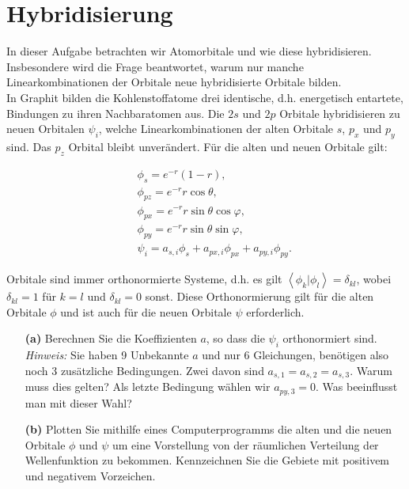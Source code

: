 \section{Hybridisierung}


In dieser Aufgabe betrachten wir Atomorbitale und wie diese hybridisieren. Insbesondere wird die Frage beantwortet, warum nur manche Linearkombinationen der Orbitale neue hybridisierte Orbitale bilden. \\

In Graphit bilden die Kohlenstoffatome drei identische, d.h. energetisch entartete, Bindungen zu ihren Nachbaratomen aus. Die $2s$ und $2p$ Orbitale hybridisieren zu neuen Orbitalen $\psi_i$, welche Linearkombinationen der alten Orbitale $s$, $p_x$ und $p_y$ sind. Das $p_z$ Orbital bleibt unverändert. Für die alten und neuen Orbitale gilt:

\begin{eqnarray*}
&&\phi_s = e^{-r} (1-r), \\
&&\phi_{pz} = e^{-r} r \cos \theta, \\
&&\phi_{px} = e^{-r} r \sin \theta \cos \varphi, \\
&&\phi_{py} = e^{-r} r \sin \theta \sin \varphi, \\
&&\psi_i = a_{s,i} \phi_s + a_{px,i} \phi_{px} + a_{py,i} \phi_{py}.
\end{eqnarray*}

Orbitale sind immer orthonormierte Systeme, d.h. es gilt $\left\langle\phi_k | \phi_l\right\rangle = \delta_{kl}$, wobei $\delta_{kl} =1$ für $k=l$ und $\delta_{kl} =0$ sonst. Diese Orthonormierung gilt für die alten Orbitale $\phi$ und ist auch für die neuen Orbitale $\psi$ erforderlich. 

\vspace{0.2cm}

\begin{itemize}

	\item[\textbf{(a)}] Berechnen Sie die Koeffizienten $a$, so dass die $\psi_i$ orthonormiert sind. \\ \textit{Hinweis:} Sie haben 9 Unbekannte $a$ und nur 6 Gleichungen, benötigen also noch 3 zusätzliche Bedingungen. Zwei davon sind $a_{s,1}=a_{s,2}=a_{s,3}$. Warum muss dies gelten? Als letzte Bedingung wählen wir $a_{py,3}=0$. Was beeinflusst man mit dieser Wahl?

  \item[\textbf{(b)}] Plotten Sie mithilfe eines Computerprogramms die alten und die neuen Orbitale $\phi$ und $\psi$ um eine Vorstellung von der räumlichen Verteilung der Wellenfunktion zu bekommen. Kennzeichnen Sie die Gebiete mit positivem und negativem Vorzeichen. \\
	
\end{itemize}



